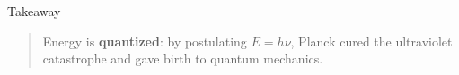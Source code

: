 \documentclass[
  ignorenonframetext,
  aspectratio=169,
  handout]{beamer}
\begin{document}
\begin{frame}{Takeaway}
\protect{}\label{takeaway}
\begin{quote}
Energy is \textbf{quantized}: by postulating \(E = h\nu\), Planck cured
the ultraviolet catastrophe and gave birth to quantum mechanics.
\end{quote}
\end{frame}
\end{document}
